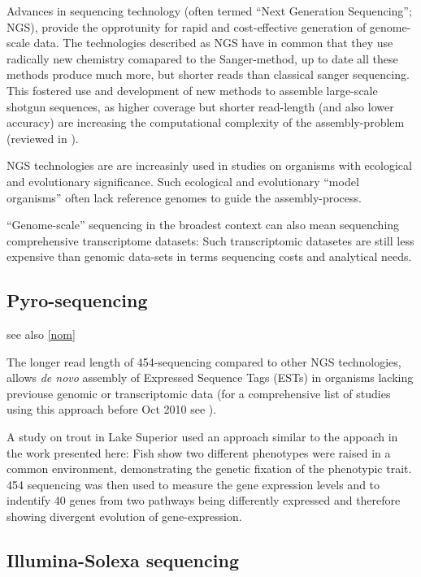 Advances in sequencing technology (often termed ``Next Generation
Sequencing''; NGS), provide the opprotunity for rapid and
cost-effective generation of genome-scale data. The technologies
described as NGS have in common that they use radically new chemistry
comapared to the Sanger-method, up to date all these methods produce
much more, but shorter reads than classical sanger sequencing. This
fostered use and development of new methods to assemble large-scale
shotgun sequences, as higher coverage but shorter read-length (and
also lower accuracy) are increasing the computational complexity of
the assembly-problem (reviewed in \cite{pmid20211242}).

NGS technologies are are increasinly used in studies on organisms with
ecological and evolutionary significance. Such ecological and
evolutionary ``model organisms'' often lack reference genomes to guide
the assembly-process.

``Genome-scale'' sequencing in the broadest context can also mean
sequenching comprehensive transcriptome datasets: Such transcriptomic
datasetes are still less expensive than genomic data-sets in terms
sequencing costs and analytical needs.


\subsection{Pyro-sequencing}
\label{pyro-seq}

see also \ref{nom}

The longer read length of 454-sequencing \cite{pmid16056220} compared
to other NGS technologies, allows \textit{de novo} assembly of
Expressed Sequence Tags (ESTs) in organisms lacking previouse genomic
or transcriptomic data (for a comprehensive list of studies using this
approach before Oct 2010 see \cite{pmid20950480}).

A study on trout in Lake Superior \cite{pmid20331779} used an approach
similar to the appoach in the work presented here: Fish show two
different phenotypes were raised in a common environment,
demonstrating the genetic fixation of the phenotypic trait. 454
sequencing was then used to measure the gene expression levels and to
indentify 40 genes from two pathways being differently expressed and
therefore showing divergent evolution of gene-expression.


\subsection{Illumina-Solexa sequencing}
\label{ill-seq}




